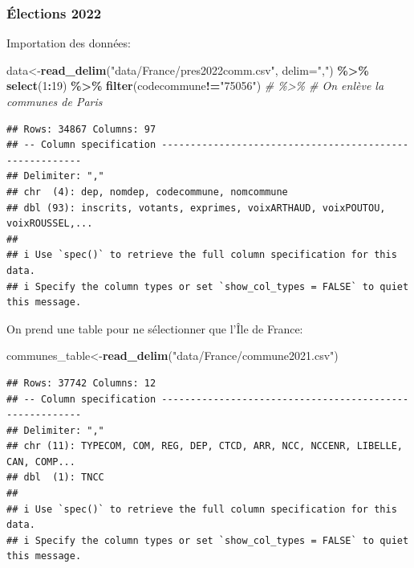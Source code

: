 \documentclass[
]{book}
\newenvironment{Shaded}{\begin{snugshade}}{\end{snugshade}}
\newcommand{\AttributeTok}[1]{\textcolor[rgb]{0.13,0.29,0.53}{#1}}
\newcommand{\CommentTok}[1]{\textcolor[rgb]{0.56,0.35,0.01}{\textit{#1}}}
\newcommand{\DecValTok}[1]{\textcolor[rgb]{0.00,0.00,0.81}{#1}}
\newcommand{\FunctionTok}[1]{\textcolor[rgb]{0.13,0.29,0.53}{\textbf{#1}}}
\newcommand{\NormalTok}[1]{#1}
\newcommand{\OtherTok}[1]{\textcolor[rgb]{0.56,0.35,0.01}{#1}}
\newcommand{\SpecialCharTok}[1]{\textcolor[rgb]{0.81,0.36,0.00}{\textbf{#1}}}
\newcommand{\StringTok}[1]{\textcolor[rgb]{0.31,0.60,0.02}{#1}}
\begin{document}
\hypertarget{uxe9lections-2022}{%
\subsubsection{Élections 2022}\label{uxe9lections-2022}}

Importation des données:

\begin{Shaded}
\begin{Highlighting}[]
\NormalTok{data}\OtherTok{\textless{}{-}}\FunctionTok{read\_delim}\NormalTok{(}\StringTok{"data/France/pres2022comm.csv"}\NormalTok{, }\AttributeTok{delim=}\StringTok{","}\NormalTok{) }\SpecialCharTok{\%\textgreater{}\%}
  \FunctionTok{select}\NormalTok{(}\DecValTok{1}\SpecialCharTok{:}\DecValTok{19}\NormalTok{) }\SpecialCharTok{\%\textgreater{}\%}
  \FunctionTok{filter}\NormalTok{(codecommune}\SpecialCharTok{!=}\StringTok{"75056"}\NormalTok{) }\CommentTok{\# \%\textgreater{}\% \# On enlève la communes de Paris}
\end{Highlighting}
\end{Shaded}

\begin{verbatim}
## Rows: 34867 Columns: 97
## -- Column specification --------------------------------------------------------
## Delimiter: ","
## chr  (4): dep, nomdep, codecommune, nomcommune
## dbl (93): inscrits, votants, exprimes, voixARTHAUD, voixPOUTOU, voixROUSSEL,...
## 
## i Use `spec()` to retrieve the full column specification for this data.
## i Specify the column types or set `show_col_types = FALSE` to quiet this message.
\end{verbatim}

On prend une table pour ne sélectionner que l'Île de France:

\begin{Shaded}
\begin{Highlighting}[]
\NormalTok{communes\_table}\OtherTok{\textless{}{-}}\FunctionTok{read\_delim}\NormalTok{(}\StringTok{"data/France/commune2021.csv"}\NormalTok{)}
\end{Highlighting}
\end{Shaded}

\begin{verbatim}
## Rows: 37742 Columns: 12
## -- Column specification --------------------------------------------------------
## Delimiter: ","
## chr (11): TYPECOM, COM, REG, DEP, CTCD, ARR, NCC, NCCENR, LIBELLE, CAN, COMP...
## dbl  (1): TNCC
## 
## i Use `spec()` to retrieve the full column specification for this data.
## i Specify the column types or set `show_col_types = FALSE` to quiet this message.
\end{verbatim}
\end{document}
